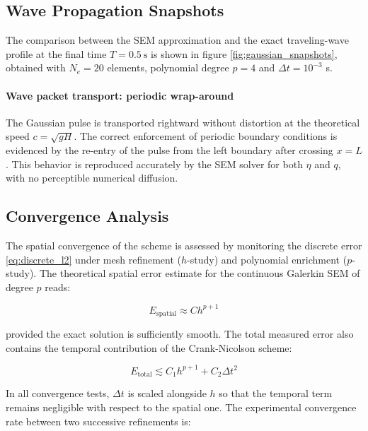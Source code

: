 \subsection{Wave Propagation Snapshots}

The comparison between the SEM approximation and the exact traveling-wave profile at the final time \(T = \SI{0.5}{\second}\) is shown in figure \ref{fig:gaussian_snapshots}, obtained with \(N_e = 20\) elements, polynomial degree \(p = 4\) and \(\Delta t = 10^{-3}\) \si{\second}.

\paragraph{Wave packet transport: periodic wrap-around}
The Gaussian pulse is transported rightward without distortion at the theoretical speed \(c = \sqrt{gH}\). The correct enforcement of periodic boundary conditions is evidenced by the re-entry of the pulse from the left boundary after crossing \(x = L\). This behavior is reproduced accurately by the SEM solver for both \(\eta\) and \(q\), with no perceptible numerical diffusion.

\subsection{Convergence Analysis}

The spatial convergence of the scheme is assessed by monitoring the discrete error \eqref{eq:discrete_l2} under mesh refinement (\(h\)-study) and polynomial enrichment (\(p\)-study). The theoretical spatial error estimate for the continuous Galerkin SEM of degree \(p\) reads:

\begin{equation}
E_{\mathrm{spatial}} \approx C h^{p+1}
\label{eq:spatial_rate}
\end{equation}

provided the exact solution is sufficiently smooth. The total measured error also contains the temporal contribution of the Crank-Nicolson scheme:

\begin{equation}
E_{\mathrm{total}} \lesssim C_1 h^{p+1} + C_2 \Delta t^2
\label{eq:total_error}
\end{equation}

In all convergence tests, \(\Delta t\) is scaled alongside \(h\) so that the temporal term remains negligible with respect to the spatial one. The experimental convergence rate between two successive refinements is:

